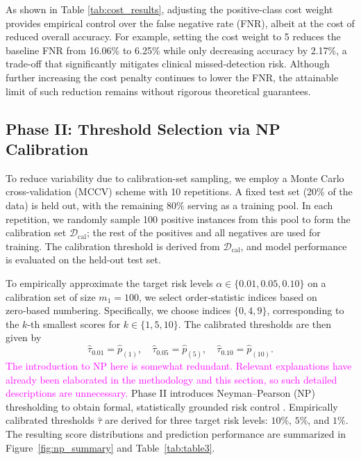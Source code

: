 \documentclass[journal,twoside,web]{ieeecolor}
\begin{document}
As shown in Table \ref{tab:cost_results}, adjusting the positive-class cost weight provides empirical control over the false negative rate (FNR), albeit at the cost of reduced overall accuracy. For example, setting the cost weight to 5 reduces the baseline FNR from 16.06\% to 6.25\% while only decreasing accuracy by 2.17\%, a trade-off that significantly mitigates clinical missed-detection risk. Although further increasing the cost penalty continues to lower the FNR, the attainable limit of such reduction remains without rigorous theoretical guarantees.


\subsection{Phase II: Threshold Selection via NP Calibration}
\label{sec:phase2_results}

To reduce variability due to calibration-set sampling, we employ a Monte Carlo cross-validation (MCCV) scheme with 10 repetitions. A fixed test set (20\% of the data) is held out, with the remaining 80\% serving as a training pool. In each repetition, we randomly sample 100 positive instances from this pool to form the calibration set \(\mathcal{D}_{\mathrm{cal}}\); the rest of the positives and all negatives are used for training. The calibration threshold is derived from \(\mathcal{D}_{\mathrm{cal}}\), and model performance is evaluated on the held-out test set.

To empirically approximate the target risk levels \(\alpha \in \{0.01, 0.05, 0.10\}\) on a calibration set of size \(m_{1}=100\), we select order‑statistic indices based on zero‑based numbering. Specifically, we choose indices \(\{0, 4, 9\}\), corresponding to the \(k\)-th smallest scores for \(k \in \{1, 5, 10\}\). The calibrated thresholds are then given by  
\[
\hat{\tau}_{0.01}=\hat{p}_{(1)},\quad 
\hat{\tau}_{0.05}=\hat{p}_{(5)},\quad 
\hat{\tau}_{0.10}=\hat{p}_{(10)}.
\]
\textcolor{magenta}{The introduction to NP here is somewhat redundant. Relevant explanations have already been elaborated in the methodology and this section, so such detailed descriptions are unnecessary.}
Phase II introduces Neyman–Pearson (NP) thresholding to obtain formal, statistically grounded risk control \cite{rigollet2011neyman,tong2018neyman}. Empirically calibrated thresholds $\hat{\tau}$ are derived for three target risk levels: $10\%$, $5\%$, and $1\%$. The resulting score distributions and prediction performance are summarized in Figure~\ref{fig:np_summary} and Table~\ref{tab:table3}.
\end{document}
